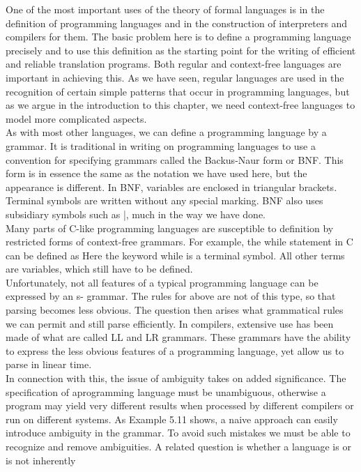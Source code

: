 \documentclass[12pt]{article}
\begin{document}
One of the most important uses of the theory of formal languages is in the definition of programming
languages and in the construction of interpreters and compilers for them. The basic problem here is to
define a programming language precisely and to use this definition as the starting point for the writing
of efficient and reliable translation programs. Both regular and context-free languages are important
in achieving this. As we have seen, regular languages are used in the recognition of certain simple
patterns that occur in programming languages, but as we argue in the introduction to this chapter, we
need context-free languages to model more complicated aspects.\\As with most other languages, we can define a programming language by a grammar. It is
traditional in writing on programming languages to use a convention for specifying grammars called
the Backus-Naur form or BNF. This form is in essence the same as the notation we have used here,
but the appearance is different. In BNF, variables are enclosed in triangular brackets. Terminal
symbols are written without any special marking. BNF also uses subsidiary symbols such as |, much
in the way we have done.\\Many parts of C-like programming languages are susceptible to definition by restricted forms of
context-free grammars. For example, the while statement in C can be defined as
Here the keyword while is a terminal symbol. All other terms are variables, which still have to be
defined.\\Unfortunately, not all features of a typical programming language can be expressed by an s-
grammar. The rules for
above are not of this type, so that parsing becomes less
obvious. The question then arises what grammatical rules we can permit and still parse efficiently. In
compilers, extensive use has been made of what are called LL and LR grammars. These grammars
have the ability to express the less obvious features of a programming language, yet allow us to parse
in linear time.\\In connection with this, the issue of ambiguity takes on added significance. The specification of aprogramming language must be unambiguous, otherwise a program may yield very different results
when processed by different compilers or run on different systems. As Example 5.11 shows, a naive
approach can easily introduce ambiguity in the grammar. To avoid such mistakes we must be able to
recognize and remove ambiguities. A related question is whether a language is or is not inherently
\end{document}
